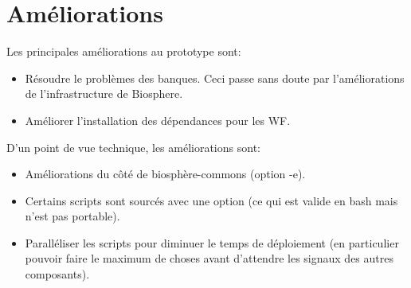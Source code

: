 \section{Améliorations}

Les principales améliorations au prototype sont:
\begin{itemize}
	\item Résoudre le problèmes des banques. Ceci passe sans doute par l'améliorations de l'infrastructure de Biosphere.
	\item Améliorer l'installation des dépendances pour les WF.
\end{itemize}

D'un point de vue technique, les améliorations sont:
\begin{itemize}
    \item Améliorations du côté de biosphère-commons (option -e).
    \item Certains scripts sont sourcés avec une option (ce qui est valide en bash mais n'est pas portable).
    \item Paralléliser les scripts pour diminuer le temps de déploiement (en particulier pouvoir faire le maximum de choses avant d'attendre les signaux des autres composants).
\end{itemize}
